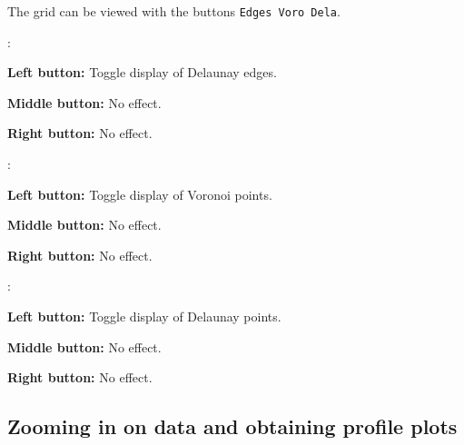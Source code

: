 The grid can be viewed with the buttons \verb+Edges Voro Dela+.
\begin{list}{}
\item {}:
\begin{list}{}
\item {\bf Left button:} Toggle display of Delaunay edges.
\item {\bf Middle button:} No effect.
\item {\bf Right button:} No effect.
\end{list}
\item {}:
\begin{list}{}
\item {\bf Left button:} Toggle display of Voronoi points.
\item {\bf Middle button:} No effect.
\item {\bf Right button:} No effect.
\end{list}
\item {}:
\begin{list}{}
\item {\bf Left button:} Toggle display of Delaunay points.
\item {\bf Middle button:} No effect.
\item {\bf Right button:} No effect.
\end{list}
\end{list}

\subsection{Zooming in on data and obtaining profile plots}

